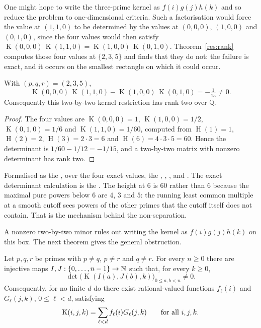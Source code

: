 \documentclass[11pt]{article}
\newcommand{\hgt}{\operatorname{H}}
\newcommand{\Kernel}{\operatorname{K}}
\begin{document}
One might hope to write the three-prime kernel as $f(i)g(j)h(k)$ and so reduce
the problem to one-dimensional criteria.  Such a factorisation would force the
value at $(1,1,0)$ to be determined by the values at $(0,0,0)$, $(1,0,0)$ and
$(0,1,0)$, since the four values would then satisfy
$\Kernel(0,0,0)\,\Kernel(1,1,0)=\Kernel(1,0,0)\,\Kernel(0,1,0)$.
Theorem~\ref{res:rank} computes those four values at $\{2,3,5\}$ and finds that
they do not: the failure is exact, and it occurs on the smallest rectangle on
which it could occur.

\begin{theorem}\label{res:rank}
With $(p,q,r)=(2,3,5)$,
\[
 \Kernel(0,0,0)\,\Kernel(1,1,0)
 -\Kernel(1,0,0)\,\Kernel(0,1,0)
 =-\tfrac1{15}\ne0.
\]
Consequently this two-by-two kernel restriction has rank two over
$\mathbb Q$.
\end{theorem}

\begin{proof}
The four values are $\Kernel(0,0,0)=1$, $\Kernel(1,0,0)=1/2$,
$\Kernel(0,1,0)=1/6$ and $\Kernel(1,1,0)=1/60$, computed from
$\hgt(1)=1$, $\hgt(2)=2$, $\hgt(3)=2\cdot3=6$ and
$\hgt(6)=4\cdot3\cdot5=60$.  Hence the determinant is
$1/60-1/12=-1/15$, and a two-by-two matrix with nonzero determinant has rank
two.
\end{proof}

\noindent Formalised as the
, over the four exact values, the
,
,
, and
.
The exact determinant calculation is the
.
The height at $6$ is $60$ rather than $6$ because the maximal pure powers below
$6$ are $4$, $3$ and $5$: the running least common multiple at a smooth cutoff
sees powers of the other primes that the cutoff itself does not contain.  That
is the mechanism behind the non-separation.

A nonzero two-by-two minor rules out writing the kernel as
$f(i)g(j)h(k)$ on this box.  The next theorem gives the general obstruction.

\begin{theorem}\label{res:infinite-rank}
Let $p,q,r$ be primes with $p\ne q$, $p\ne r$ and $q\ne r$.  For every
$n\ge0$ there are injective maps $I,J:\{0,\ldots,n-1\}\to\mathbb{N}$ such that, for
every $k\ge0$,
\[
 \det\bigl(\Kernel(I(a),J(b),k)\bigr)_{0\le a,b<n}\ne0.
\]
Consequently, for no finite $d$ do there exist rational-valued functions
$f_\ell(i)$ and $G_\ell(j,k)$, $0\le\ell<d$, satisfying
\[
 \Kernel(i,j,k)=\sum_{\ell<d}f_\ell(i)G_\ell(j,k)
 \qquad\hbox{for all }i,j,k.
\]
\end{theorem}
\end{document}
